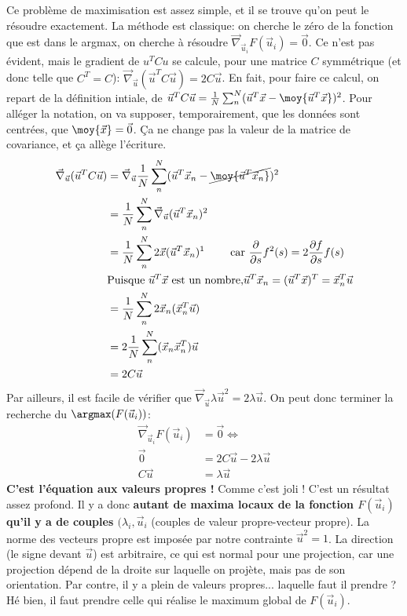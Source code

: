 \documentclass[french,twoside]{article}
\newcommand{\cad}{\text{c'est-à-dire} }
\begin{document}
Ce problème de maximisation est assez simple, et il se trouve qu'on peut le résoudre exactement.
La méthode est classique: on cherche le zéro de la fonction que est dans le argmax, \cad on cherche à résoudre $\vec \nabla_{\vec u_i} F(\vec u_i)=\vec 0$.
Ce n'est pas évident, mais le gradient de $ u^T C u$ se calcule, pour une matrice $C$ symmétrique (et donc telle que $C^T=C$): $\vec \nabla_{\vec u} (\vec u^T C \vec u) = 2 C \vec u$. 
En fait, pour faire ce calcul, on repart de la définition intiale, \cad de $\vec u^T C \vec u = \frac1N \sum^N_n (\vec u^T \vec x - \moy{\vec u^T \vec x})^2$. 
Pour alléger la notation, on va supposer, temporairement, que les données sont centrées, \cad que $\moy{\vec x}=\vec 0$. Ça ne change pas la valeur de la matrice de covariance, et ça allège l'écriture.
\begin{align}
\vec \nabla_{\vec u} (\vec u^T C \vec u) 
&= \vec \nabla_{\vec u} \frac1N \sum^N_n (\vec u^T \vec x_n - \cancel{ \moy{\vec u^T \vec x_n}} )^2
\\&=  \frac1N \sum^N_n  \vec \nabla_{\vec u} (\vec u^T \vec x_n)^2 
\\&=  \frac1N \sum^N_n  2 \vec x (\vec u^T \vec x_n)^1 \qquad \text{ car } \frac{\partial }{\partial s} f^2(s)=2 \frac{\partial f }{\partial s} f(s)
\\& \text{Puisque $\vec u^T \vec x$ est un nombre,} \vec u^T \vec x_n = (\vec u^T \vec x)^T =  \vec x_n^T \vec u
\\&=  \frac1N \sum^N_n  2  \vec x_n (\vec x_n^T \vec u)
\\&= 2 \frac1N \sum^N_n (\vec x_n \vec x_n^T) \vec u
\\&=  2 C \vec u
\end{align}
Par ailleurs, il est facile de vérifier que $\vec \nabla_{\vec u} \lambda \vec u^2 = 2\lambda \vec u$.
On peut donc terminer la recherche du $\argmax(F(\vec u_i))$:
\begin{align}
\vec \nabla_{\vec u_i} F(\vec u_i)
&=\vec 0 \Leftrightarrow  
\\\vec 0  &= 2 C \vec u - 2 \lambda \vec u 
\\C \vec u &= \lambda \vec u
\end{align}
\textbf{C'est l'équation aux valeurs propres !} Comme c'est joli ! C'est un résultat assez profond.
Il y a donc \textbf{autant de maxima locaux de la fonction $F(\vec u_i)$ qu'il y a de couples $(\lambda_i, \vec u_i$} (couples de valeur propre-vecteur propre).
La norme des vecteurs propre est imposée par notre contrainte $\vec u^2=1$. La direction (le signe devant $\vec u$) est arbitraire, ce qui est normal pour une projection, car une projection dépend de la droite sur laquelle on projète, mais pas de son orientation.
Par contre, il y a plein de valeurs propres... laquelle faut il prendre ? Hé bien, il faut prendre celle qui réalise le maximum global de $F(\vec u_i)$.
\end{document}
